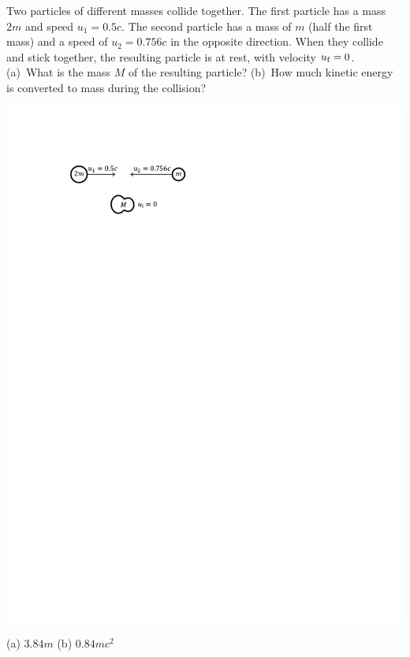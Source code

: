 \begin{minipage}{0.60 \textwidth}
\begin{Exercise}[difficulty=0]
\label{prob_collision_2m_and_m}
Two particles of different masses collide together.  The first particle has a mass $2m$ and speed $u_1=0.5c$.  The second particle has a mass of $m$ (half the first mass) and a speed of $u_2=0.756c$ in the opposite direction.  When they collide and stick together, the resulting particle is at rest, with velocity $u_{\rm f}=0$.  (a)~What is the mass $M$ of the resulting particle?  (b)~How much kinetic energy is converted to mass during the collision?
\end{Exercise}
\end{minipage}
\begin{minipage}{0.39 \textwidth}
\hspace{\fill}\includegraphics[scale=0.9]{M_problems/energy_mass/collision_m_and_2m.pdf}
\end{minipage}
\begin{Answer}
(a) $3.84m$ (b) $0.84mc^2$
\end{Answer}


